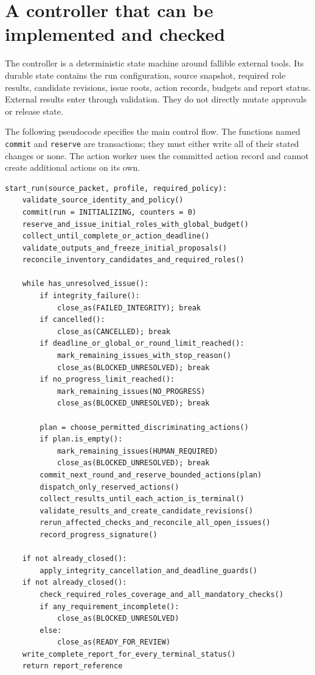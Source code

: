 \documentclass[12pt,a4paper,oneside,openany]{book}
\begin{document}
\section{A controller that can be implemented and checked}
\label{merge:M06:15}


The controller is a deterministic state machine around fallible external tools.
Its durable state contains the run configuration, source snapshot, required role
results, candidate revisions, issue roots, action records, budgets and report
status. External results enter through validation. They do not directly mutate
approvals or release state.

The following pseudocode specifies the main control flow. The functions named
\texttt{commit} and \texttt{reserve} are transactions; they must either write all
of their stated changes or none. The action worker uses the committed action
record and cannot create additional actions on its own.

\begin{lstlisting}[caption={Main controller, with explicit terminal uncertainty.}]
start_run(source_packet, profile, required_policy):
    validate_source_identity_and_policy()
    commit(run = INITIALIZING, counters = 0)
    reserve_and_issue_initial_roles_with_global_budget()
    collect_until_complete_or_action_deadline()
    validate_outputs_and_freeze_initial_proposals()
    reconcile_inventory_candidates_and_required_roles()

    while has_unresolved_issue():
        if integrity_failure():
            close_as(FAILED_INTEGRITY); break
        if cancelled():
            close_as(CANCELLED); break
        if deadline_or_global_or_round_limit_reached():
            mark_remaining_issues_with_stop_reason()
            close_as(BLOCKED_UNRESOLVED); break
        if no_progress_limit_reached():
            mark_remaining_issues(NO_PROGRESS)
            close_as(BLOCKED_UNRESOLVED); break

        plan = choose_permitted_discriminating_actions()
        if plan.is_empty():
            mark_remaining_issues(HUMAN_REQUIRED)
            close_as(BLOCKED_UNRESOLVED); break
        commit_next_round_and_reserve_bounded_actions(plan)
        dispatch_only_reserved_actions()
        collect_results_until_each_action_is_terminal()
        validate_results_and_create_candidate_revisions()
        rerun_affected_checks_and_reconcile_all_open_issues()
        record_progress_signature()

    if not already_closed():
        apply_integrity_cancellation_and_deadline_guards()
    if not already_closed():
        check_required_roles_coverage_and_all_mandatory_checks()
        if any_requirement_incomplete():
            close_as(BLOCKED_UNRESOLVED)
        else:
            close_as(READY_FOR_REVIEW)
    write_complete_report_for_every_terminal_status()
    return report_reference
\end{lstlisting}
\end{document}
